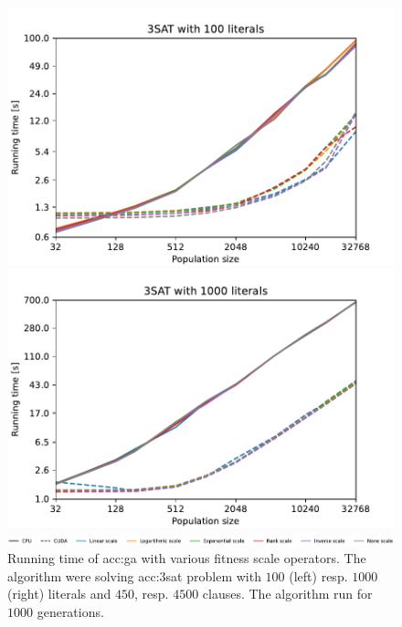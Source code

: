 \begin{figure}[ht!]
    \centering
    \begin{minipage}[t]{0.9\textwidth}
        \begin{minipage}[t]{0.48\textwidth}
            \includegraphics[width=\textwidth]{img/runs/time_ga_scale_100l.pdf}
        \end{minipage}
        \begin{minipage}[t]{0.48\textwidth}
            \includegraphics[width=\textwidth]{img/runs/time_ga_scale_1000l.pdf}
        \end{minipage}
    \end{minipage}

    \begin{minipage}[t]{0.9\textwidth}
        \includegraphics[width=\textwidth]{img/runs/time_ga_scale_legend.pdf}
    \end{minipage}

    \caption[Running time of genetic algorithm with various scale operators]{Running time of \acrlong{acc:ga} with various fitness scale operators. The algorithm were solving \acrshort{acc:3sat} problem with $100$ (left) resp. $1000$ (right) literals and $450$, resp. $4500$ clauses. The algorithm run for $1000$ generations.}
\end{figure}



